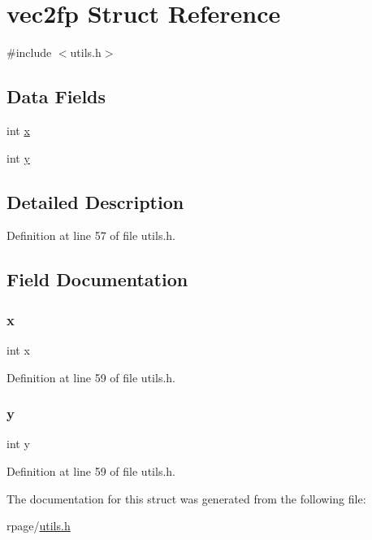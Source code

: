 \hypertarget{structvec2fp}{}\section{vec2fp Struct Reference}
\label{structvec2fp}


{\ttfamily \#include $<$utils.\+h$>$}

\subsection*{Data Fields}
\begin{DoxyCompactItemize}
\item 
int \mbox{\hyperlink{structvec2fp_a6150e0515f7202e2fb518f7206ed97dc}{x}}
\item 
int \mbox{\hyperlink{structvec2fp_a0a2f84ed7838f07779ae24c5a9086d33}{y}}
\end{DoxyCompactItemize}


\subsection{Detailed Description}


Definition at line 57 of file utils.\+h.



\subsection{Field Documentation}
\mbox{\label{structvec2fp_a6150e0515f7202e2fb518f7206ed97dc}} 
\subsubsection{\texorpdfstring{x}{x}}
{\footnotesize\ttfamily int x}



Definition at line 59 of file utils.\+h.

\mbox{\label{structvec2fp_a0a2f84ed7838f07779ae24c5a9086d33}} 
\subsubsection{\texorpdfstring{y}{y}}
{\footnotesize\ttfamily int y}



Definition at line 59 of file utils.\+h.



The documentation for this struct was generated from the following file\+:\begin{DoxyCompactItemize}
\item 
rpage/\mbox{\hyperlink{utils_8h}{utils.\+h}}\end{DoxyCompactItemize}
